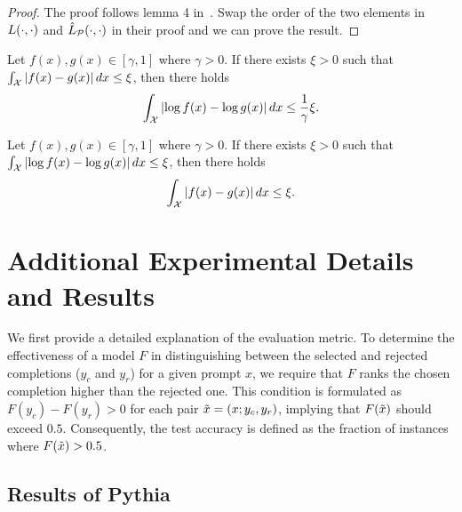 \begin{proof}
The proof follows lemma 4 in~\citet{yao2025understanding}.
Swap the order of the two elements in $L(\cdot, \cdot)$ and $\hat{L}_{\mathcal{P}}(\cdot, \cdot)$ in their proof and we can prove the result.
\end{proof}




\begin{claim} \label{claim_xlnx}
Let $f(x), g(x) \in [\gamma,1]$ where $\gamma>0$. If there exists $\xi>0$ such that $\int_{\mathcal{X}} \left|f(x)-g(x) \right| d x \le \xi$,
then there holds
$$\int_{\mathcal{X}} \left| \log f(x)- \log g(x) \right| d x \le \frac{1}{\gamma}\xi.$$
\end{claim}



\begin{claim} \label{claim_xlnx_reverse}
Let $f(x), g(x) \in [\gamma,1]$ where $\gamma>0$. 
If there exists $\xi>0$ such that $\int_{\mathcal{X}} \left| \log f(x) - \log g(x) \right| d x \le \xi$,
then there holds
$$\int_{\mathcal{X}} \left| f(x)- g(x) \right| d x \le \xi.$$
\end{claim}







\section{Additional Experimental Details and Results}

We first provide a detailed explanation of the evaluation metric.
To determine the effectiveness of a model $F$ in distinguishing between the selected and rejected completions ($y_c$ and $y_r$) for a given prompt $x$, we require that $F$ ranks the chosen completion higher than the rejected one.
This condition is formulated as $F(y_c)-F(y_r)>0$ for each pair $\Tilde{x}=(x;y_c,y_r)$, implying that $F(\Tilde{x})$ should exceed $0.5$.
Consequently, the test accuracy is defined as the fraction of instances where $F(\Tilde{x})>0.5$.




\subsection{Results of Pythia} \label{exp_result_pythia}

